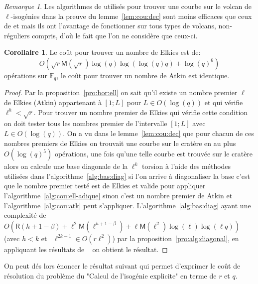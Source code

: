 \documentclass[10pt,a4paper]{book}
\theoremstyle{plain}
\theoremstyle{definition}
\theoremstyle{definition}
\theoremstyle{definition}
\newtheorem{cor}[thm]{Corollaire}
\theoremstyle{definition}
\theoremstyle{definition}
\theoremstyle{remark}
\newtheorem{rem}[thm]{Remarque}
\theoremstyle{remark}
\theoremstyle{definition}
\begin{document}
\begin{rem}
Les algorithmes de \cite{FouquetMorain02} utilisés pour trouver une courbe sur 
le volcan de $\ell$-isogénies  dans la preuve du 
lemme~\ref{lem:cou:dec} sont moins efficaces que ceux de 
\cite{Ionica-Joux10} et \cite{MiretMRV05} mais ils ont l'avantage de 
fonctionner sur tous types de volcans, non-réguliers compris, d'où le fait que
l'on ne considère que ceux-ci.
\end{rem}

\begin{cor}
\label{cor:atk:elk:dist}
Le coût pour trouver un nombre de Elkies est de:
\[O(\sqrt{r}\mathsf{M}(\sqrt{r})\log(q)\log(\log(q) q)+\log(q)^6)\]
opérations sur $\mathbb{F}_q$, le coût pour trouver un nombre de Atkin est 
identique.
\end{cor}

\begin{proof}
Par la proposition~\ref{pro:bor:ell} on sait qu'il existe un nombre premier 
$\ell$ de Elkies (Atkin) appartenant à $[1;L]$ pour $L \in O(\log(q))$ et qui 
vérifie $\ell^{h} < \sqrt{r}$. Pour trouver un nombre premier de Elkies qui 
vérifie cette condition on doit tester tous les nombres premier de l'intervalle
$[1;L]$ avec $L \in O(\log(q))$. On a vu dans le lemme~\ref{lem:cou:dec} 
que pour chacun de ces nombres premiers de Elkies on trouvait une courbe sur le
cratère en au plus $O(\log(q)^5)$ opérations, une fois qu'une telle courbe est 
trouvée sur le cratère alors on calcule une base diagonale de la $\ell^k$ 
torsion à l'aide des méthodes utilisées dans l'algorithme~\ref{alg:bas:diag} si
l'on arrive à diagonaliser la base c'est que le nombre premier testé est de 
Elkies et valide pour appliquer l'algorithme~\ref{alg:cou:ell-adique} sinon 
c'est un nombre premier de Atkin et l'algorithme~\ref{alg:cou:atk} peut 
s'appliquer. L'algorithme~\ref{alg:bas:diag} ayant une complexité de 
$O(\mathsf{R}(h+1-\beta)+\ell^2\mathsf{M}(\ell^{h+1-\beta})+\ell 
\mathsf{M}(\ell^2)\log(\ell)\log(\ell q))$ (avec $h<k$ et ~$\ell^{2k-1} \in O(r\ell^2)$)
par la proposition~\ref{pro:alg:diagonal}, en appliquant les résultats de 
~\cite[Chapter~14.5]{vzGJG03} on obtient le résultat.
\end{proof}

On peut dés lors énoncer le résultat suivant qui permet d'exprimer le coût de 
résolution du problème du "Calcul de l'isogénie explicite" en terme de $r$ et $q$.
\end{document}
